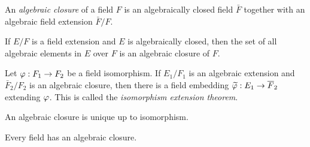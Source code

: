 \documentclass{../../large}
\begin{document}
\begin{prb}
An \emph{algebraic closure} of a field $F$ is an algebraically closed field $\bar F$ together with an algebraic field extension $\bar F/F$.
\begin{parts}
\item
If $E/F$ is a field extension and $E$ is algebraically closed, then the set of all algebraic elements in $E$ over $F$ is an algebraic closure of $F$.
\item 
Let $\varphi:F_1\to F_2$ be a field isomorphism.
If $E_1/F_1$ is an algebraic extension and $\bar F_2/F_2$ is an algebraic closure, then there is a field embedding $\widetilde{\varphi}:E_1\to\overline F_2$ extending $\varphi$.
This is called the \emph{isomorphism extension theorem}.
\item
An algebraic closure is unique up to isomorphism.
\item
Every field has an algebraic closure.
\end{parts}
\end{prb}
\end{document}
